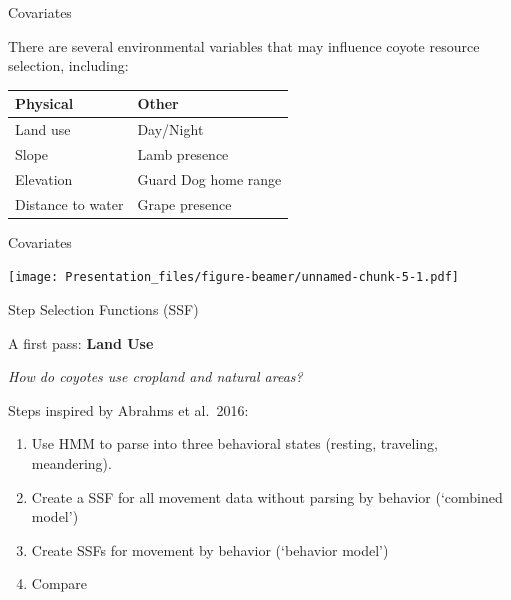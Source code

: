 \documentclass[
  ignorenonframetext,
]{beamer}
\providecommand{\tightlist}{%
  \setlength{\itemsep}{0pt}\setlength{\parskip}{0pt}}
\begin{document}
\begin{frame}{Covariates}
\protect\hypertarget{covariates}{}

There are several environmental variables that may influence coyote
resource selection, including:

\begin{tabu} to 
\hline
\begingroup\fontsize{30}{32}\selectfont Physical\endgroup & \begingroup\fontsize{30}{32}\selectfont Other\endgroup\\
\hline
Land use & Day/Night\\
\hline
Slope & Lamb presence\\
\hline
Elevation & Guard Dog home range\\
\hline
Distance to water & Grape presence\\
\hline
\end{tabu}

\end{frame}

\begin{frame}{Covariates}
\protect\hypertarget{covariates-1}{}

\texttt{[image: Presentation\_files/figure-beamer/unnamed-chunk-5-1.pdf]}

\end{frame}

\begin{frame}{Step Selection Functions (SSF)}
\protect\hypertarget{step-selection-functions-ssf}{}

A first pass: \textbf{Land Use}

\emph{How do coyotes use cropland and natural areas?}

Steps inspired by Abrahms et al.~2016:

\begin{enumerate}
\tightlist
\item
  Use HMM to parse into three behavioral states (resting, traveling,
  meandering).
\item
  Create a SSF for all movement data without parsing by behavior
  (`combined model')
\item
  Create SSFs for movement by behavior (`behavior model')
\item
  Compare
\end{enumerate}

\end{frame}
\end{document}
